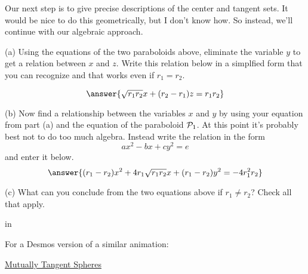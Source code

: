 \documentclass{ximera}
\newcommand{\pskip}{\vskip 0.1 in}
\begin{document}
\begin{question} \label{Q5r43rd:Spheres}

Our next step is to give precise descriptions of the center and tangent sets. It would be nice to do this geometrically, but I don't know how. So instead, we'll continue with our algebraic approach.

(a) Using the equations of the two paraboloids above, eliminate the variable $y$ to get a relation between $x$ and $z$. Write this relation below in a simplfied form that you can recognize and that works even if $r_1 = r_2$.

\[
    \answer{\sqrt{r_1 r_2}x + (r_2 - r_1) z = r_1 r_2}
\]

(b) Now find a relationship between the variables $x$ and $y$ by using your equation from part (a) and the equation of the paraboloid ${\cal P}_1$. At this point it's probably best not to do too much algebra. Instead write the relation in the form 
\[
   ax^2 - bx + cy^2 = e 
\]
and enter it below.
\[
    \answer{(r_1 - r_2)x^2 + 4 r_1\sqrt{r_1r_2}x + (r_1-r_2)y^2 = - 4r_1^2 r_2}
\]

(c) What can you conclude from the two equations above if $r_1\neq r_2$? Check all that apply.
 \begin{selectAll}  
  \end{selectAll}  



 
\begin{onlineOnly}
    \begin{center}
\end{center}
\end{onlineOnly}


\end{question}


\pskip
 
For a Desmos version of a similar animation:

\href{https://www.desmos.com/3d/7fb88aea41}{Mutually Tangent Spheres}
\end{document}
